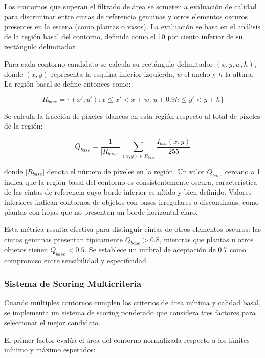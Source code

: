Los contornos que superan el filtrado de área se someten a evaluación de calidad para discriminar entre cintas de referencia genuinas y otros elementos oscuros presentes en la escena (como plantas o vasos). La evaluación se basa en el análisis de la región basal del contorno, definida como el 10 por ciento inferior de su rectángulo delimitador.

Para cada contorno candidato se calcula su rectángulo delimitador $(x, y, w, h)$, donde $(x,y)$ representa la esquina inferior izquierda, $w$ el ancho y $h$ la altura. La región basal se define entonces como:

\begin{equation}
R_{base} = \{(x',y') : x \leq x' < x+w, \, y+0.9h \leq y' < y+h\}
\end{equation}

Se calcula la fracción de píxeles blancos en esta región respecto al total de píxeles de la región:

\begin{equation}
Q_{base} = \frac{1}{|R_{base}|} \sum_{(x,y) \in R_{base}} \frac{I_{bin}(x,y)}{255}
\end{equation}

donde $|R_{base}|$ denota el número de píxeles en la región. Un valor $Q_{base}$ cercano a 1 indica que la región basal del contorno es consistentemente oscura, característica de las cintas de referencia cuyo borde inferior es nítido y bien definido. Valores inferiores indican contornos de objetos con bases irregulares o discontinuas, como plantas con hojas que no presentan un borde horizontal claro.

Esta métrica resulta efectiva para distinguir cintas de otros elementos oscuros: las cintas genuinas presentan típicamente $Q_{base} > 0.8$, mientras que plantas u otros objetos tienen $Q_{base} < 0.5$. Se establece un umbral de aceptación de 0.7 como compromiso entre sensibilidad y especificidad.

\subsubsection{Sistema de Scoring Multicriteria}

Cuando múltiples contornos cumplen los criterios de área mínima y calidad basal, se implementa un sistema de scoring ponderado que considera tres factores para seleccionar el mejor candidato.

El primer factor evalúa el área del contorno normalizada respecto a los límites mínimo y máximo esperados:

